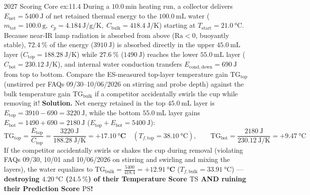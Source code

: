 \begin{workedexample}{2027 Scoring Core }{ex:11.4}
During a $\SI{10.0}{\minute}$ heating run, a collector delivers $E_{\mathrm{net}} = \SI{5400}{\joule}$ of net retained thermal energy to the $\SI{100.0}{\milli\liter}$ water ($m_{\mathrm{tot}} = \SI{100.0}{\gram},\; c_p = \SI{4.184}{\joule\per\gram\per\kelvin},\; C_{\mathrm{bulk}} = \SI{418.4}{\joule\per\kelvin}$) starting at $T_{\mathrm{start}} = \SI{21.0}{\celsius}$. Because near-IR lamp radiation is absorbed from above ($\mathrm{Ra} < 0$, buoyantly stable), $\SI{72.4}{\percent}$ of the energy ($\SI{3910}{\joule}$) is absorbed directly in the upper $\SI{45.0}{\milli\liter}$ layer ($C_{\mathrm{top}} = \SI{188.28}{\joule\per\kelvin}$) while $\SI{27.6}{\percent}$ ($\SI{1490}{\joule}$) reaches the lower $\SI{55.0}{\milli\liter}$ layer ($C_{\mathrm{bot}} = \SI{230.12}{\joule\per\kelvin}$), and internal water conduction transfers $E_{\mathrm{cond,down}} = \SI{690}{\joule}$ from top to bottom. Compare the ES-measured top-layer temperature gain $\mathrm{TG}_{\mathrm{top}}$ (unstirred per FAQs 09/30--10/06/2026 on stirring and probe depth) against the bulk temperature gain $\mathrm{TG}_{\mathrm{bulk}}$ if a competitor accidentally swirls the cup while removing it!
\tcblower
\textbf{Solution.} Net energy retained in the top $\SI{45.0}{\milli\liter}$ layer is $E_{\mathrm{top}} = 3910 - 690 = \SI{3220}{\joule}$, while the bottom $\SI{55.0}{\milli\liter}$ layer gains $E_{\mathrm{bot}} = 1490 + 690 = \SI{2180}{\joule}$ ($E_{\mathrm{top}} + E_{\mathrm{bot}} = \SI{5400}{\joule}$):
\[
  \mathrm{TG}_{\mathrm{top}} = \frac{E_{\mathrm{top}}}{C_{\mathrm{top}}} = \frac{\SI{3220}{\joule}}{\SI{188.28}{\joule\per\kelvin}} = \mathbf{+\SI{17.10}{\celsius}} \quad (T_{f,\mathrm{top}} = \SI{38.10}{\celsius}), \qquad
  \mathrm{TG}_{\mathrm{bot}} = \frac{\SI{2180}{\joule}}{\SI{230.12}{\joule\per\kelvin}} = +\SI{9.47}{\celsius}
\]
If the competitor accidentally swirls or shakes the cup during removal (violating FAQs 09/30, 10/01 and 10/06/2026 on stirring and swirling and mixing the layers), the water equalizes to $\mathrm{TG}_{\mathrm{bulk}} = \frac{5400}{418.4} = \mathbf{+\SI{12.91}{\celsius}}$ ($T_{f,\mathrm{bulk}} = \SI{33.91}{\celsius}$) — \textbf{destroying $\SI{4.20}{\celsius}$ ($\SI{24.5}{\percent}$) of their Temperature Score $\mathrm{TS}$ AND ruining their Prediction Score $\mathrm{PS}$!}
\end{workedexample}

